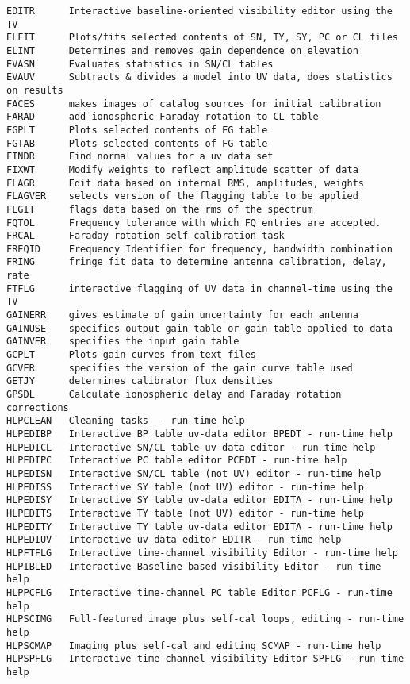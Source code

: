 \begin{verbatim}
EDITR      Interactive baseline-oriented visibility editor using the TV
ELFIT      Plots/fits selected contents of SN, TY, SY, PC or CL files
ELINT      Determines and removes gain dependence on elevation
EVASN      Evaluates statistics in SN/CL tables
EVAUV      Subtracts & divides a model into UV data, does statistics on results
FACES      makes images of catalog sources for initial calibration
FARAD      add ionospheric Faraday rotation to CL table
FGPLT      Plots selected contents of FG table
FGTAB      Plots selected contents of FG table
FINDR      Find normal values for a uv data set
FIXWT      Modify weights to reflect amplitude scatter of data
FLAGR      Edit data based on internal RMS, amplitudes, weights
FLAGVER    selects version of the flagging table to be applied
FLGIT      flags data based on the rms of the spectrum
FQTOL      Frequency tolerance with which FQ entries are accepted.
FRCAL      Faraday rotation self calibration task
FREQID     Frequency Identifier for frequency, bandwidth combination
FRING      fringe fit data to determine antenna calibration, delay, rate
FTFLG      interactive flagging of UV data in channel-time using the TV
GAINERR    gives estimate of gain uncertainty for each antenna
GAINUSE    specifies output gain table or gain table applied to data
GAINVER    specifies the input gain table
GCPLT      Plots gain curves from text files
GCVER      specifies the version of the gain curve table used
GETJY      determines calibrator flux densities
GPSDL      Calculate ionospheric delay and Faraday rotation corrections
HLPCLEAN   Cleaning tasks  - run-time help
HLPEDIBP   Interactive BP table uv-data editor BPEDT - run-time help
HLPEDICL   Interactive SN/CL table uv-data editor - run-time help
HLPEDIPC   Interactive PC table editor PCEDT - run-time help
HLPEDISN   Interactive SN/CL table (not UV) editor - run-time help
HLPEDISS   Interactive SY table (not UV) editor - run-time help
HLPEDISY   Interactive SY table uv-data editor EDITA - run-time help
HLPEDITS   Interactive TY table (not UV) editor - run-time help
HLPEDITY   Interactive TY table uv-data editor EDITA - run-time help
HLPEDIUV   Interactive uv-data editor EDITR - run-time help
HLPFTFLG   Interactive time-channel visibility Editor - run-time help
HLPIBLED   Interactive Baseline based visibility Editor - run-time help
HLPPCFLG   Interactive time-channel PC table Editor PCFLG - run-time help
HLPSCIMG   Full-featured image plus self-cal loops, editing - run-time help
HLPSCMAP   Imaging plus self-cal and editing SCMAP - run-time help
HLPSPFLG   Interactive time-channel visibility Editor SPFLG - run-time help

\end{verbatim}
